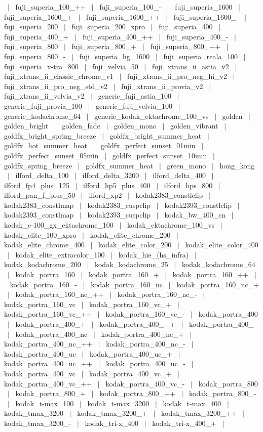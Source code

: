 \documentclass[a4paper,10.5pt,twoside]{book}
\begin{document}
~$|$~ fuji\_superia\_100\_++ ~$|$~ fuji\_superia\_100\_- ~$|$~ fuji\_superia\_1600 ~$|$~ fuji\_superia\_1600\_+ ~$|$~ fuji\_superia\_1600\_++ ~$|$~ fuji\_superia\_1600\_- ~$|$~ fuji\_superia\_200 ~$|$~ fuji\_superia\_200\_xpro ~$|$~ fuji\_superia\_400 ~$|$~ fuji\_superia\_400\_+ ~$|$~ fuji\_superia\_400\_++ ~$|$~ fuji\_superia\_400\_- ~$|$~ fuji\_superia\_800 ~$|$~ fuji\_superia\_800\_+ ~$|$~ fuji\_superia\_800\_++ ~$|$~ fuji\_superia\_800\_- ~$|$~ fuji\_superia\_hg\_1600 ~$|$~ fuji\_superia\_reala\_100 ~$|$~ fuji\_superia\_x-tra\_800 ~$|$~ fuji\_velvia\_50 ~$|$~ fuji\_xtrans\_ii\_astia\_v2 ~$|$~ fuji\_xtrans\_ii\_classic\_chrome\_v1 ~$|$~ fuji\_xtrans\_ii\_pro\_neg\_hi\_v2 ~$|$~ fuji\_xtrans\_ii\_pro\_neg\_std\_v2 ~$|$~ fuji\_xtrans\_ii\_provia\_v2 ~$|$~ fuji\_xtrans\_ii\_velvia\_v2 ~$|$~ generic\_fuji\_astia\_100 ~$|$~ generic\_fuji\_provia\_100 ~$|$~ generic\_fuji\_velvia\_100 ~$|$~ generic\_kodachrome\_64 ~$|$~ generic\_kodak\_ektachrome\_100\_vs ~$|$~ golden ~$|$~ golden\_bright ~$|$~ golden\_fade ~$|$~ golden\_mono ~$|$~ golden\_vibrant ~$|$~ goldfx\_bright\_spring\_breeze ~$|$~ goldfx\_bright\_summer\_heat ~$|$~ goldfx\_hot\_summer\_heat ~$|$~ goldfx\_perfect\_sunset\_01min ~$|$~ goldfx\_perfect\_sunset\_05min ~$|$~ goldfx\_perfect\_sunset\_10min ~$|$~ goldfx\_spring\_breeze ~$|$~ goldfx\_summer\_heat ~$|$~ green\_mono ~$|$~ hong\_kong ~$|$~ ilford\_delta\_100 ~$|$~ ilford\_delta\_3200 ~$|$~ ilford\_delta\_400 ~$|$~ ilford\_fp4\_plus\_125 ~$|$~ ilford\_hp5\_plus\_400 ~$|$~ ilford\_hps\_800 ~$|$~ ilford\_pan\_f\_plus\_50 ~$|$~ ilford\_xp2 ~$|$~ kodak2383\_constlclip ~$|$~ kodak2383\_constlmap ~$|$~ kodak2383\_cuspclip ~$|$~ kodak2393\_constlclip ~$|$~ kodak2393\_constlmap ~$|$~ kodak2393\_cuspclip ~$|$~ kodak\_bw\_400\_cn ~$|$~ kodak\_e-100\_gx\_ektachrome\_100 ~$|$~ kodak\_ektachrome\_100\_vs ~$|$~ kodak\_elite\_100\_xpro ~$|$~ kodak\_elite\_chrome\_200 ~$|$~ kodak\_elite\_chrome\_400 ~$|$~ kodak\_elite\_color\_200 ~$|$~ kodak\_elite\_color\_400 ~$|$~ kodak\_elite\_extracolor\_100 ~$|$~ kodak\_hie\_(hs\_infra) ~$|$~ kodak\_kodachrome\_200 ~$|$~ kodak\_kodachrome\_25 ~$|$~ kodak\_kodachrome\_64 ~$|$~ kodak\_portra\_160 ~$|$~ kodak\_portra\_160\_+ ~$|$~ kodak\_portra\_160\_++ ~$|$~ kodak\_portra\_160\_- ~$|$~ kodak\_portra\_160\_nc ~$|$~ kodak\_portra\_160\_nc\_+ ~$|$~ kodak\_portra\_160\_nc\_++ ~$|$~ kodak\_portra\_160\_nc\_- ~$|$~ kodak\_portra\_160\_vc ~$|$~ kodak\_portra\_160\_vc\_+ ~$|$~ kodak\_portra\_160\_vc\_++ ~$|$~ kodak\_portra\_160\_vc\_- ~$|$~ kodak\_portra\_400 ~$|$~ kodak\_portra\_400\_+ ~$|$~ kodak\_portra\_400\_++ ~$|$~ kodak\_portra\_400\_- ~$|$~ kodak\_portra\_400\_nc ~$|$~ kodak\_portra\_400\_nc\_+ ~$|$~ kodak\_portra\_400\_nc\_++ ~$|$~ kodak\_portra\_400\_nc\_- ~$|$~ kodak\_portra\_400\_uc ~$|$~ kodak\_portra\_400\_uc\_+ ~$|$~ kodak\_portra\_400\_uc\_++ ~$|$~ kodak\_portra\_400\_uc\_- ~$|$~ kodak\_portra\_400\_vc ~$|$~ kodak\_portra\_400\_vc\_+ ~$|$~ kodak\_portra\_400\_vc\_++ ~$|$~ kodak\_portra\_400\_vc\_- ~$|$~ kodak\_portra\_800 ~$|$~ kodak\_portra\_800\_+ ~$|$~ kodak\_portra\_800\_++ ~$|$~ kodak\_portra\_800\_- ~$|$~ kodak\_t-max\_100 ~$|$~ kodak\_t-max\_3200 ~$|$~ kodak\_t-max\_400 ~$|$~ kodak\_tmax\_3200 ~$|$~ kodak\_tmax\_3200\_+ ~$|$~ kodak\_tmax\_3200\_++ ~$|$~ kodak\_tmax\_3200\_- ~$|$~ kodak\_tri-x\_400 ~$|$~ kodak\_tri-x\_400\_+ ~$|$~ 
\end{document}
